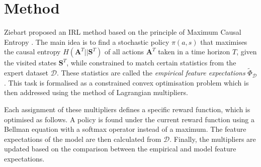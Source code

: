 \documentclass[conference]{IEEEtran}
\begin{document}
\section{Method}
Ziebart proposed an IRL method based on the principle of Maximum Causal Entropy \cite{ziebart2010modelingthesis}.  The main idea is to find a stochastic policy $\pi(a,s)$ that maximises the causal entropy $H(\mathbf{A}^T||\mathbf{S}^T)$ of all actions $\mathbf{A}^T$ taken in a time horizon $T$, given the visited states $\mathbf{S}^T$, while constrained to match certain statistics from the expert dataset $\mathcal{D}$. These statistics are called the \emph{empirical feature expectations} $\widetilde{\Phi}_{\mathcal{D}}$. This task is formalised as a constrained convex optimisation problem which is then addressed using the method of Lagrangian multipliers.  

Each assignment of these multipliers defines a specific reward function, which is optimised as follows. A policy is found under the current reward function using a Bellman equation with a softmax operator instead of a maximum.  The feature expectations of the model are then calculated from $\mathcal{D}$. Finally, the multipliers are updated based on the comparison between the empirical and model feature expectations.
\end{document}
